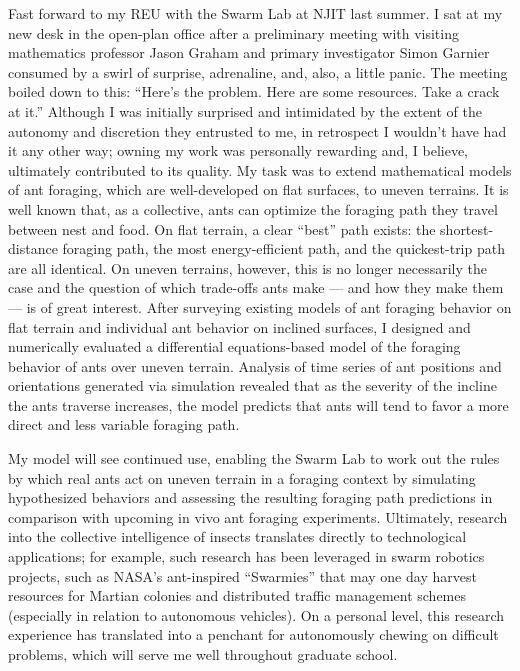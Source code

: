 Fast forward to my REU with the Swarm Lab at NJIT last summer.
I sat at my new desk in the open-plan office after a preliminary meeting with visiting mathematics professor Jason Graham and primary investigator Simon Garnier consumed by a swirl of surprise, adrenaline, and, also, a little panic.
The meeting boiled down to this:
``Here's the problem.
Here are some resources.
Take a crack at it.''
Although I was initially surprised and intimidated by the extent of the autonomy and discretion they entrusted to me, in retrospect I wouldn't have had it any other way; owning my work was personally rewarding and, I believe, ultimately contributed to its quality.
My task was to extend mathematical models of ant foraging, which are well-developed on flat surfaces, to uneven terrains.
It is well known that, as a collective, ants can optimize the foraging path they travel between nest and food.
On flat terrain, a clear ``best'' path exists: the shortest-distance foraging path, the most energy-efficient path, and the quickest-trip path are all identical.
On uneven terrains, however, this is no longer necessarily the case and the question of which trade-offs ants make --- and how they make them --- is of great interest.
After surveying existing models of ant foraging behavior on flat terrain and individual ant behavior on inclined surfaces, I designed and numerically evaluated a differential equations-based model of the foraging behavior of ants over uneven terrain.
Analysis of time series of ant positions and orientations generated via simulation revealed that as the severity of the incline the ants traverse increases, the model predicts that ants will tend to favor a more direct and less variable foraging path.

My model will see continued use, enabling the Swarm Lab to work out the rules by which real ants act on uneven terrain in a foraging context by simulating hypothesized behaviors and assessing the resulting foraging path predictions in comparison with upcoming in vivo ant foraging experiments.
Ultimately, research into the collective intelligence of insects translates directly to technological applications; for example, such research has been leveraged in swarm robotics projects, such as NASA's ant-inspired ``Swarmies'' that may one day harvest resources for Martian colonies and distributed traffic management schemes (especially in relation to autonomous vehicles).
On a personal level, this research experience has translated into a penchant for autonomously chewing on difficult problems, which will serve me well throughout graduate school.
